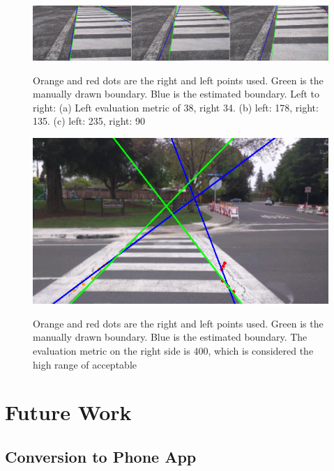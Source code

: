 \documentclass[12pt]{ucthesis}
\newcommand{\captionfonts}{\small\bf\ssp}
\begin{document}
\begin{figure}[t]
\begin{center}
\includegraphics[width=15cm]{LinesUsingJustGoodStartAndEnds2.png}
\captionfonts
\caption[Boundary Line Estimation Results]{Orange and red dots are the right and left points used. Green is the manually drawn boundary. Blue is the estimated boundary. Left to right: (a) Left evaluation metric of 38, right 34. (b) left: 178, right: 135. (c) left: 235, right: 90}
\label{fig:LinesUsingJustGoodStartAndEnds2}
\end{center}
\end{figure}

\begin{figure}[t]
\begin{center}
\includegraphics[width=12cm]{400RightSide.png}
\captionfonts
\caption[Upper Limit of Boundary Line Metric]{Orange and red dots are the right and left points used. Green is the manually drawn boundary. Blue is the estimated boundary. The evaluation metric on the right side is 400, which is considered the high range of acceptable}
\label{fig:400Metric}
\end{center}
\end{figure}


\chapter{Future Work}
\label{future work}

\section{Conversion to Phone App}
\end{document}
